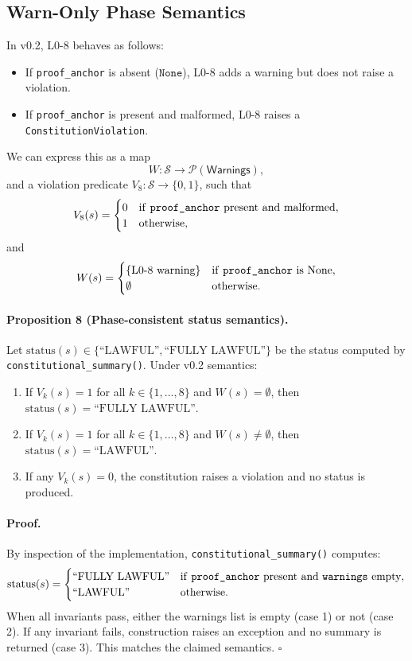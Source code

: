\documentclass[11pt]{article}
\begin{document}
\subsection{Warn-Only Phase Semantics}

In v0.2, L0-8 behaves as follows:\cite{cite:41,cite:43,cite:46,cite:47}
\begin{itemize}
  \item If \texttt{proof\_anchor} is absent (\(\texttt{None}\)), L0-8 adds a warning but does not raise a violation.
  \item If \texttt{proof\_anchor} is present and malformed, L0-8 raises a \texttt{ConstitutionViolation}.
\end{itemize}
We can express this as a map
\[
  W : \mathcal{S} \rightarrow \mathcal{P}(\mathsf{Warnings}),
\]
and a violation predicate \(V_8 : \mathcal{S}\rightarrow\{0,1\}\), such that
\[
  V_8(s) =
  \begin{cases}
    0 & \text{if \texttt{proof\_anchor} present and malformed},\\
    1 & \text{otherwise},
  \end{cases}
\]
and
\[
  W(s) =
  \begin{cases}
    \{\text{L0-8 warning}\} & \text{if \texttt{proof\_anchor} is None},\\
    \emptyset & \text{otherwise}.
  \end{cases}
\]

\paragraph{Proposition 8 (Phase-consistent status semantics).}
Let \(\mathrm{status}(s)\in\{\text{``LAWFUL''},\text{``FULLY LAWFUL''}\}\) be the status computed by \texttt{constitutional\_summary()}.\cite{cite:41,cite:43}
Under v0.2 semantics:
\begin{enumerate}
  \item If \(V_k(s)=1\) for all \(k\in\{1,\dots,8\}\) and \(W(s) = \emptyset\), then \(\mathrm{status}(s) = \text{``FULLY LAWFUL''}\).
  \item If \(V_k(s)=1\) for all \(k\in\{1,\dots,8\}\) and \(W(s) \neq \emptyset\), then \(\mathrm{status}(s) = \text{``LAWFUL''}\).
  \item If any \(V_k(s)=0\), the constitution raises a violation and no status is produced.
\end{enumerate}

\paragraph{Proof.}
By inspection of the implementation, \texttt{constitutional\_summary()} computes:\cite{cite:41}
\[
  \mathrm{status}(s) = 
  \begin{cases}
    \text{``FULLY LAWFUL''} & \text{if \texttt{proof\_anchor} present and \texttt{warnings} empty},\\
    \text{``LAWFUL''} & \text{otherwise}.
  \end{cases}
\]
When all invariants pass, either the warnings list is empty (case 1) or not (case 2). If any invariant fails, construction raises an exception and no summary is returned (case 3). This matches the claimed semantics. \(\square\)
\end{document}
